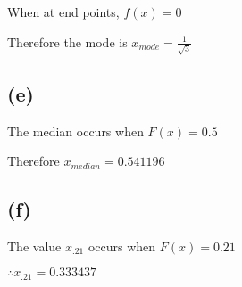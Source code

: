 \documentclass[12pt]{article}
\begin{document}
\begin{spacing}{2.0}
When at end points, $f(x)=0$

Therefore the mode is $x_{mode}=\frac{1}{\sqrt{3}}$

\subsection*{(e)}

The median occurs when $F(x)= 0.5$

Therefore $x_{median}= 0.541196$

\subsection*{(f)}

The value $x_{.21}$ occurs when $F(x)=0.21$

$\therefore x_{.21}=0.333437$

\end{spacing}
\end{document}
